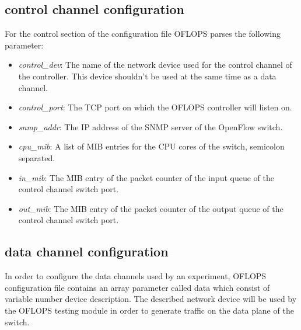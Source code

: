 \documentclass{book}
\begin{document}
          \subsection{control channel configuration}
          For the control section of the configuration file OFLOPS parses the following parameter:
          \begin{itemize}
          \item \emph{control\_dev}: The name of the network device used for the control channel of 
          the controller. This device shouldn't be used at the same time as a data channel. 
          \item \emph{control\_port}: The TCP port on which the OFLOPS controller will listen on.
          \item \emph{snmp\_addr}: The IP address of the SNMP server of the OpenFlow switch.
          \item \emph{cpu\_mib}: A list of MIB entries for the CPU cores of the switch, semicolon 
          separated.
          \item \emph{in\_mib}: The MIB entry of the packet counter of the input queue of the control 
          channel switch port. 
          \item \emph{out\_mib}: The MIB entry of the packet counter of the output queue of the control 
          channel switch port.
          \end{itemize} 

          \subsection{data channel configuration}

          In order to configure the data channels used by an experiment, OFLOPS 
          configuration file contains an array parameter called data which consist 
          of variable number device description. The described network device will
          be used by the OFLOPS testing module in order to generate traffic on the data
          plane of the switch. 
\end{document}
